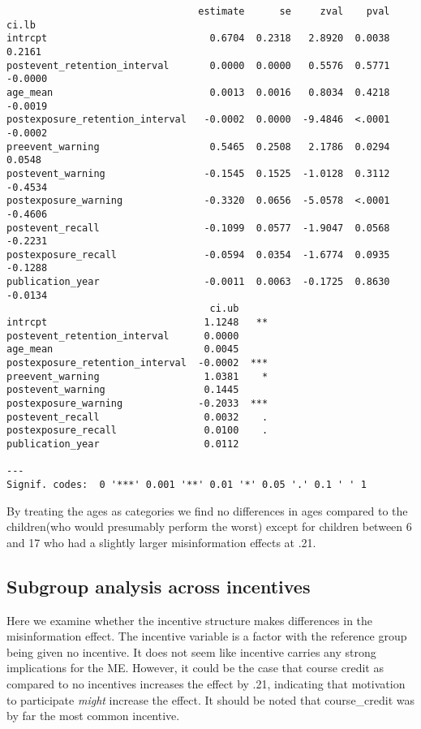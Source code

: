 \documentclass[
  letterpaper,
  DIV=11,
  numbers=noendperiod]{scrartcl}
\begin{document}
\begin{verbatim}
                                 estimate      se     zval    pval    ci.lb 
intrcpt                            0.6704  0.2318   2.8920  0.0038   0.2161 
postevent_retention_interval       0.0000  0.0000   0.5576  0.5771  -0.0000 
age_mean                           0.0013  0.0016   0.8034  0.4218  -0.0019 
postexposure_retention_interval   -0.0002  0.0000  -9.4846  <.0001  -0.0002 
preevent_warning                   0.5465  0.2508   2.1786  0.0294   0.0548 
postevent_warning                 -0.1545  0.1525  -1.0128  0.3112  -0.4534 
postexposure_warning              -0.3320  0.0656  -5.0578  <.0001  -0.4606 
postevent_recall                  -0.1099  0.0577  -1.9047  0.0568  -0.2231 
postexposure_recall               -0.0594  0.0354  -1.6774  0.0935  -0.1288 
publication_year                  -0.0011  0.0063  -0.1725  0.8630  -0.0134 
                                   ci.ub      
intrcpt                           1.1248   ** 
postevent_retention_interval      0.0000      
age_mean                          0.0045      
postexposure_retention_interval  -0.0002  *** 
preevent_warning                  1.0381    * 
postevent_warning                 0.1445      
postexposure_warning             -0.2033  *** 
postevent_recall                  0.0032    . 
postexposure_recall               0.0100    . 
publication_year                  0.0112      

---
Signif. codes:  0 '***' 0.001 '**' 0.01 '*' 0.05 '.' 0.1 ' ' 1
\end{verbatim}

By treating the ages as categories we find no differences in ages
compared to the children(who would presumably perform the worst) except
for children between 6 and 17 who had a slightly larger misinformation
effects at .21.

\hypertarget{subgroup-analysis-across-incentives}{%
\subsection{Subgroup analysis across
incentives}\label{subgroup-analysis-across-incentives}}

Here we examine whether the incentive structure makes differences in the
misinformation effect. The incentive variable is a factor with the
reference group being given no incentive. It does not seem like
incentive carries any strong implications for the ME. However, it could
be the case that course credit as compared to no incentives increases
the effect by .21, indicating that motivation to participate
\emph{might} increase the effect. It should be noted that course\_credit
was by far the most common incentive.
\end{document}
